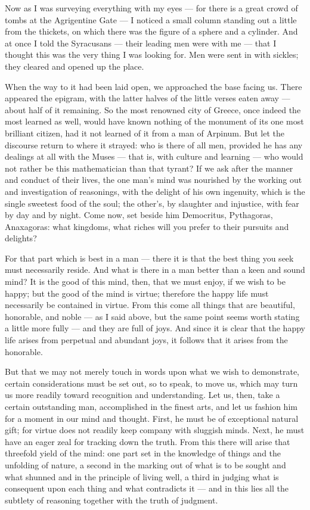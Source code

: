  Now as I was surveying everything with my eyes — for there is a great crowd of tombs at the Agrigentine Gate — I noticed a small column standing out a little from the thickets, on which there was the figure of a sphere and a cylinder. And at once I told the Syracusans — their leading men were with me — that I thought this was the very thing I was looking for. Men were sent in with sickles; they cleared and opened up the place.

 When the way to it had been laid open, we approached the base facing us. There appeared the epigram, with the latter halves of the little verses eaten away — about half of it remaining. So the most renowned city of Greece, once indeed the most learned as well, would have known nothing of the monument of its one most brilliant citizen, had it not learned of it from a man of Arpinum. But let the discourse return to where it strayed: who is there of all men, provided he has any dealings at all with the Muses — that is, with culture and learning — who would not rather be this mathematician than that tyrant? If we ask after the manner and conduct of their lives, the one man's mind was nourished by the working out and investigation of reasonings, with the delight of his own ingenuity, which is the single sweetest food of the soul; the other's, by slaughter and injustice, with fear by day and by night. Come now, set beside him Democritus, Pythagoras, Anaxagoras: what kingdoms, what riches will you prefer to their pursuits and delights?

 For that part which is best in a man — there it is that the best thing you seek must necessarily reside. And what is there in a man better than a keen and sound mind? It is the good of this mind, then, that we must enjoy, if we wish to be happy; but the good of the mind is virtue; therefore the happy life must necessarily be contained in virtue. From this come all things that are beautiful, honorable, and noble — as I said above, but the same point seems worth stating a little more fully — and they are full of joys. And since it is clear that the happy life arises from perpetual and abundant joys, it follows that it arises from the honorable.

 But that we may not merely touch in words upon what we wish to demonstrate, certain considerations must be set out, so to speak, to move us, which may turn us more readily toward recognition and understanding. Let us, then, take a certain outstanding man, accomplished in the finest arts, and let us fashion him for a moment in our mind and thought. First, he must be of exceptional natural gift; for virtue does not readily keep company with sluggish minds. Next, he must have an eager zeal for tracking down the truth. From this there will arise that threefold yield of the mind: one part set in the knowledge of things and the unfolding of nature, a second in the marking out of what is to be sought and what shunned and in the principle of living well, a third in judging what is consequent upon each thing and what contradicts it — and in this lies all the subtlety of reasoning together with the truth of judgment.

